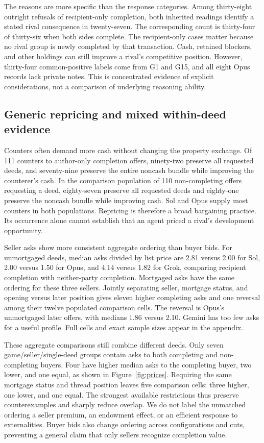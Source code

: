 The reasons are more specific than the response categories. Among thirty-eight outright refusals of recipient-only completion, both inherited readings identify a stated rival consequence in twenty-seven. The corresponding count is thirty-four of thirty-six when both sides complete. The recipient-only cases matter because no rival group is newly completed by that transaction. Cash, retained blockers, and other holdings can still improve a rival's competitive position. However, thirty-four common-positive labels come from G1 and G15, and all eight Opus records lack private notes. This is concentrated evidence of explicit considerations, not a comparison of underlying reasoning ability.

\subsection{Generic repricing and mixed within-deed evidence}

Counters often demand more cash without changing the property exchange. Of 111 counters to author-only completion offers, ninety-two preserve all requested deeds, and seventy-nine preserve the entire noncash bundle while improving the counterer's cash. In the comparison population of 110 non-completing offers requesting a deed, eighty-seven preserve all requested deeds and eighty-one preserve the noncash bundle while improving cash. Sol and Opus supply most counters in both populations. Repricing is therefore a broad bargaining practice. Its occurrence alone cannot establish that an agent priced a rival's development opportunity.

Seller asks show more consistent aggregate ordering than buyer bids. For unmortgaged deeds, median asks divided by list price are 2.81 versus 2.00 for Sol, 2.00 versus 1.50 for Opus, and 4.14 versus 1.82 for Grok, comparing recipient completion with neither-party completion. Mortgaged asks have the same ordering for these three sellers. Jointly separating seller, mortgage status, and opening versus later position gives eleven higher completing asks and one reversal among their twelve populated comparison cells. The reversal is Opus's unmortgaged later offers, with medians 1.86 versus 2.10. Gemini has too few asks for a useful profile. Full cells and exact sample sizes appear in the appendix.

These aggregate comparisons still combine different deeds. Only seven game/seller/single-deed groups contain asks to both completing and non-completing buyers. Four have higher median asks to the completing buyer, two lower, and one equal, as shown in Figure~\ref{fig:prices}. Requiring the same mortgage status and thread position leaves five comparison cells: three higher, one lower, and one equal. The strongest available restrictions thus preserve counterexamples and sharply reduce overlap. We do not label the unmatched ordering a seller premium, an endowment effect, or an efficient response to externalities. Buyer bids also change ordering across configurations and cuts, preventing a general claim that only sellers recognize completion value.

